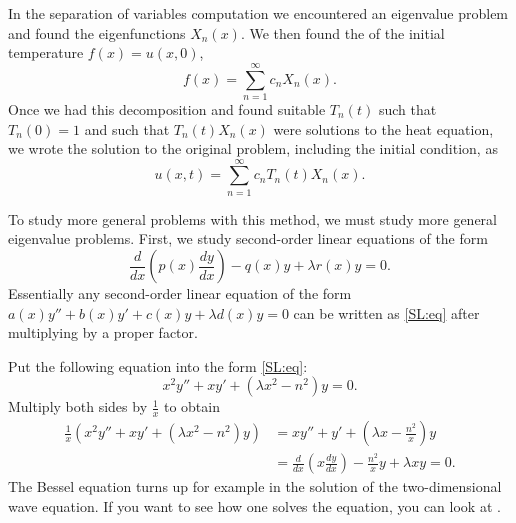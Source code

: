 In the separation of variables computation
we encountered an eigenvalue problem and found the
eigenfunctions
$X_n(x)$.  We then found the \emph{} of
the initial
temperature $f(x) = u(x,0)$,
\begin{equation*}
f(x) = \sum_{n=1}^\infty c_n X_n(x) .
\end{equation*}
Once we had this decomposition
and found suitable $T_n(t)$ such that $T_n(0) = 1$
and such that $T_n(t)X_n(x)$ were solutions to the heat equation,
we wrote the solution to the original problem, including the initial
condition, as
\begin{equation*}
u(x,t) = \sum_{n=1}^\infty c_n T_n(t) X_n(x) .
\end{equation*}

\medskip

To study more general problems with this method, we must study
more general eigenvalue problems.
First, we study 
second-order linear equations of the form
\begin{equation} \label{SL:eq}
\frac{d}{dx} \left( p(x) \frac{dy}{dx} \right)
- q(x) y + \lambda r(x) y = 0 .
\end{equation}
Essentially
any second-order linear equation
of the form $a(x) y'' + b(x) y' + c(x) y + \lambda d(x) y = 0$
can be written as \eqref{SL:eq}
after multiplying by a proper factor.

\begin{example}[Bessel]
Put the following equation into the form \eqref{SL:eq}:
\begin{equation*}
x^2 y'' + xy' + \left(\lambda x^2 - n^2\right)y = 0 .
\end{equation*}
Multiply both sides by $\frac{1}{x}$ to obtain
\begin{equation*}
\begin{split}
\frac{1}{x} \left( x^2 y'' + xy' + \left(\lambda x^2 - n^2\right)y \right)
& =
x y'' + y' + \left(\lambda x - \frac{n^2}{x}\right)y 
\\
& =
\frac{d}{dx} \left( x \frac{dy}{dx} \right)
- \frac{n^2}{x} y + \lambda x y  = 0.
\end{split}
\end{equation*}
The Bessel equation turns up for example in the solution of
the two-dimensional wave equation.
If you want to see how one solves the equation,
you can look at .
\end{example}

